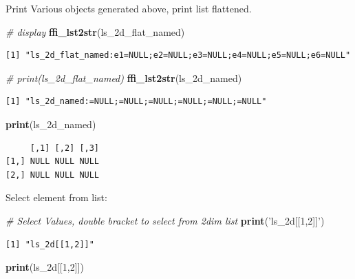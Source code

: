 \documentclass[
]{book}
\newenvironment{Shaded}{\begin{snugshade}}{\end{snugshade}}
\newcommand{\CommentTok}[1]{\textcolor[rgb]{0.56,0.35,0.01}{\textit{#1}}}
\newcommand{\DecValTok}[1]{\textcolor[rgb]{0.00,0.00,0.81}{#1}}
\newcommand{\KeywordTok}[1]{\textcolor[rgb]{0.13,0.29,0.53}{\textbf{#1}}}
\newcommand{\NormalTok}[1]{#1}
\newcommand{\StringTok}[1]{\textcolor[rgb]{0.31,0.60,0.02}{#1}}
\begin{document}
Print Various objects generated above, print list flattened.

\begin{Shaded}
\begin{Highlighting}[]
\CommentTok{# display}
\KeywordTok{ffi_lst2str}\NormalTok{(ls_2d_flat_named)}
\end{Highlighting}
\end{Shaded}

\begin{verbatim}
[1] "ls_2d_flat_named:e1=NULL;e2=NULL;e3=NULL;e4=NULL;e5=NULL;e6=NULL"
\end{verbatim}

\begin{Shaded}
\begin{Highlighting}[]
\CommentTok{# print(ls_2d_flat_named)}
\KeywordTok{ffi_lst2str}\NormalTok{(ls_2d_named)}
\end{Highlighting}
\end{Shaded}

\begin{verbatim}
[1] "ls_2d_named:=NULL;=NULL;=NULL;=NULL;=NULL;=NULL"
\end{verbatim}

\begin{Shaded}
\begin{Highlighting}[]
\KeywordTok{print}\NormalTok{(ls_2d_named)}
\end{Highlighting}
\end{Shaded}

\begin{verbatim}
     [,1] [,2] [,3]
[1,] NULL NULL NULL
[2,] NULL NULL NULL
\end{verbatim}

Select element from list:

\begin{Shaded}
\begin{Highlighting}[]
\CommentTok{# Select Values, double bracket to select from 2dim list}
\KeywordTok{print}\NormalTok{(}\StringTok{'ls_2d[[1,2]]'}\NormalTok{)}
\end{Highlighting}
\end{Shaded}

\begin{verbatim}
[1] "ls_2d[[1,2]]"
\end{verbatim}

\begin{Shaded}
\begin{Highlighting}[]
\KeywordTok{print}\NormalTok{(ls_2d[[}\DecValTok{1}\NormalTok{,}\DecValTok{2}\NormalTok{]])}
\end{Highlighting}
\end{Shaded}
\end{document}
